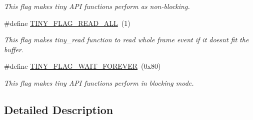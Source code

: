 \begin{DoxyCompactItemize}
\begin{DoxyCompactList}\small\item\em This flag makes tiny A\+P\+I functions perform as non-\/blocking. \end{DoxyCompactList}\item 
\hypertarget{group__FLAGS__GROUP_gae41123cfeed375e618a4152c9bbd0d6d}{}\#define \hyperlink{group__FLAGS__GROUP_gae41123cfeed375e618a4152c9bbd0d6d}{T\+I\+N\+Y\+\_\+\+F\+L\+A\+G\+\_\+\+R\+E\+A\+D\+\_\+\+A\+L\+L}~(1)\label{group__FLAGS__GROUP_gae41123cfeed375e618a4152c9bbd0d6d}

\begin{DoxyCompactList}\small\item\em This flag makes tiny\+\_\+read function to read whole frame event if it doesn\textquotesingle{}t fit the buffer. \end{DoxyCompactList}\item 
\hypertarget{group__FLAGS__GROUP_ga3a34267804581c5709d03f52d232b307}{}\#define \hyperlink{group__FLAGS__GROUP_ga3a34267804581c5709d03f52d232b307}{T\+I\+N\+Y\+\_\+\+F\+L\+A\+G\+\_\+\+W\+A\+I\+T\+\_\+\+F\+O\+R\+E\+V\+E\+R}~(0x80)\label{group__FLAGS__GROUP_ga3a34267804581c5709d03f52d232b307}

\begin{DoxyCompactList}\small\item\em This flag makes tiny A\+P\+I functions perform in blocking mode. \end{DoxyCompactList}\end{DoxyCompactItemize}


\subsection{Detailed Description}

